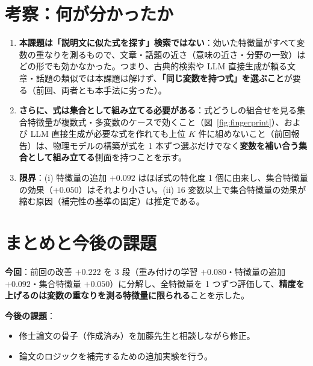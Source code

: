 \documentclass[11pt,a4paper]{ltjsarticle}
\begin{document}
\section{考察：何が分かったか}\label{sec:discussion}
\begin{enumerate}[leftmargin=1.8em]
  \item \textbf{本課題は「説明文に似た式を探す」検索ではない}：効いた特徴量がすべて変数の重なりを測るもので、文章・話題の近さ（意味の近さ・分野の一致）はどの形でも効かなかった。つまり、古典的検索や LLM 直接生成が頼る文章・話題の類似では本課題は解けず、\textbf{「同じ変数を持つ式」を選ぶこと}が要る（前回、両者とも本手法に劣った）。
  \item \textbf{さらに、式は集合として組み立てる必要がある}：式どうしの組合せを見る集合特徴量が複数式・多変数のケースで効くこと（図~\ref{fig:fingerprint}）、および LLM 直接生成が必要な式を作れても上位 $K$ 件に組めないこと（前回報告）は、物理モデルの構築が式を 1 本ずつ選ぶだけでなく\textbf{変数を補い合う集合として組み立てる}側面を持つことを示す。
  \item \textbf{限界}：(i) 特徴量の追加 $+0.092$ はほぼ式の特化度 1 個に由来し、集合特徴量の効果（$+0.050$）はそれより小さい。(ii) 16 変数以上で集合特徴量の効果が縮む原因（補完性の基準の固定）は推定である。
\end{enumerate}

\section{まとめと今後の課題}
\textbf{今回}：前回の改善 $+0.222$ を 3 段（重み付けの学習 $+0.080$・特徴量の追加 $+0.092$・集合特徴量 $+0.050$）に分解し、全特徴量を 1 つずつ評価して、\textbf{精度を上げるのは変数の重なりを測る特徴量に限られる}ことを示した。

\textbf{今後の課題}：
\begin{itemize}[leftmargin=1.5em]
  \item 修士論文の骨子（作成済み）を加藤先生と相談しながら修正。
  \item 論文のロジックを補完するための追加実験を行う。
\end{itemize}
\end{document}
